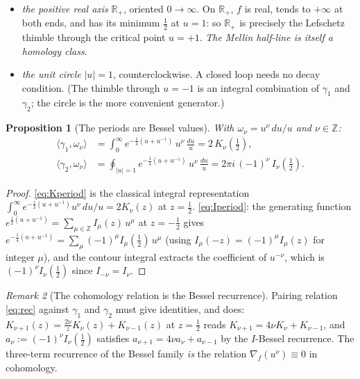 \documentclass[11pt]{article}
\newtheorem{proposition}{Proposition}[section]
\theoremstyle{definition}
\theoremstyle{remark}
\newtheorem{remark}[proposition]{Remark}
\newcommand{\R}{\mathbb{R}}
\newcommand{\Z}{\mathbb{Z}}
\begin{document}
\begin{itemize}
\item[$\gamma_1$:] \emph{the positive real axis} $\R_+$, oriented
$0 \to \infty$. On $\R_+$, $f$ is real, tends to $+\infty$ at both
ends, and has its minimum $\tfrac12$ at $u = 1$: so $\R_+$ is
precisely the Lefschetz thimble through the critical point $u=+1$.
\emph{The Mellin half-line is itself a homology class.}
\item[$\gamma_2$:] \emph{the unit circle} $|u| = 1$,
counterclockwise. A closed loop needs no decay condition. (The
thimble through $u = -1$ is an integral combination of $\gamma_1$
and $\gamma_2$; the circle is the more convenient generator.)
\end{itemize}

\begin{proposition}[The periods are Bessel values]\label{prop:periods}
With $\omega_\nu = u^\nu\,du/u$ and $\nu \in \Z$:
\begin{align}
  \langle \gamma_1, \omega_\nu \rangle
  &= \int_0^\infty e^{-\frac14(u+u^{-1})}\,u^\nu\,\frac{du}{u}
   = 2\,K_\nu(\tfrac12), \label{eq:Kperiod}\\
  \langle \gamma_2, \omega_\nu \rangle
  &= \oint_{|u|=1} e^{-\frac14(u+u^{-1})}\,u^\nu\,\frac{du}{u}
   = 2\pi i\,(-1)^\nu\, I_\nu(\tfrac12). \label{eq:Iperiod}
\end{align}
\end{proposition}

\begin{proof}
\eqref{eq:Kperiod} is the classical integral representation
$\int_0^\infty e^{-\frac z2(u+u^{-1})}u^\nu\,du/u = 2K_\nu(z)$ at
$z = \tfrac12$. \eqref{eq:Iperiod}: the generating function
$e^{\frac z2(u+u^{-1})} = \sum_{\mu\in\Z} I_\mu(z)\,u^\mu$ at
$z = -\tfrac12$ gives $e^{-\frac14(u+u^{-1})} = \sum_\mu
(-1)^\mu I_\mu(\tfrac12)\,u^\mu$ (using $I_\mu(-z) =
(-1)^\mu I_\mu(z)$ for integer $\mu$), and the contour integral
extracts the coefficient of $u^{-\nu}$, which is
$(-1)^\nu I_\nu(\tfrac12)$ since $I_{-\nu} = I_\nu$.
\end{proof}

\begin{remark}[The cohomology relation is the Bessel recurrence]
Pairing relation \eqref{eq:rec} against $\gamma_1$ and $\gamma_2$
must give identities, and does: $K_{\nu+1}(z) = \tfrac{2\nu}{z}
K_\nu(z) + K_{\nu-1}(z)$ at $z=\tfrac12$ reads $K_{\nu+1} =
4\nu K_\nu + K_{\nu-1}$, and $a_\nu := (-1)^\nu I_\nu(\tfrac12)$
satisfies $a_{\nu+1} = 4\nu a_\nu + a_{\nu-1}$ by the $I$-Bessel
recurrence. The three-term recurrence of the Bessel family
\emph{is} the relation $\nabla_f(u^\nu) \equiv 0$ in cohomology.
\end{remark}
\end{document}
